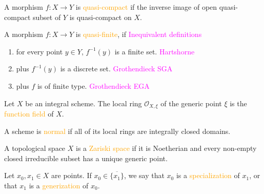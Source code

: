 \begin{definition}
	A morphism $f:X\rightarrow Y$ is \textcolor{orange}{quasi-compact} if the inverse image of open quasi-compact subset of $Y$ is quasi-compact on $X$.
	
{
	A morphism $f:X\rightarrow Y$ is \textcolor{orange}{quasi-finite}, if \tabto{9cm}\textcolor{magenta}{Inequivalent definitions}
	\begin{enumerate}[label=\textup{(\roman*)},ref=(\roman*)]
		\item\label{quasifinite1} for every point $y\in Y$, $f^{-1}(y)$ is a finite set. \tabto{8cm}\textcolor{magenta}{Hartshorne}
		\item\label{quasifinite2}  plus $f^{-1}(y)$ is a discrete set. \tabto{8cm}\textcolor{magenta}{Grothendieck SGA}
		\item\label{quasifinite3}  plus $f$ is of finite type. \tabto{8cm}\textcolor{magenta}{Grothendieck EGA}
	\end{enumerate}
}
\end{definition}

\begin{definition}
	Let $X$ be an integral scheme. The local ring $\mathcal{O}_{X,\xi}$ of the generic point $\xi$ is the \textcolor{orange}{function field} of $X$.
\end{definition}

\begin{definition}
	A scheme is \textcolor{orange}{normal} if all of its local rings are integrally closed domains.
\end{definition}

\begin{definition}
	A topological space $X$ is a \textcolor{orange}{Zariski space} if it is Noetherian and every non-empty closed irreducible subset has a unique generic point.
\end{definition}

\begin{definition}
	Let $x_0, x_1\in X$ are points. If $x_0\in\overline{\{x_1\}}$, we say that $x_0$ is a \textcolor{orange}{specialization} of $x_1$, or that $x_1$ is a \textcolor{orange}{generization} of $x_0$.
\end{definition}


